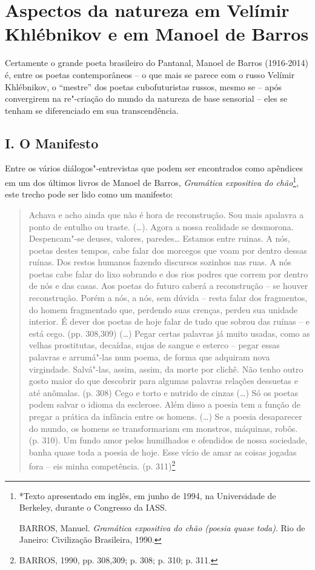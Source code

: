 \chapter{Aspectos da natureza em Velímir Khlébnikov e em Manoel de Barros}

Certamente o grande poeta brasileiro do Pantanal, Manoel de Barros
(1916-2014) é, entre os poetas contemporâneos -- o que mais se parece
com o russo Velímir Khlébnikov, o ``mestre'' dos poetas cubofuturistas
russos, mesmo se -- após convergirem na re"-criação do mundo da natureza
de base sensorial -- eles se tenham se diferenciado em sua
transcendência.

\section{I. O Manifesto}

Entre os vários diálogos"-entrevistas que podem ser encontrados como
apêndices em um dos últimos livros de Manoel de Barros, \emph{Gramática
expositiva do chão}\footnote{*Texto apresentado em inglês, em junho de
  1994, na Universidade de Berkeley, durante o Congresso da IASS.

  BARROS, Manuel. \emph{Gramática expositiva do chão (poesia quase
  toda)}. Rio de Janeiro: Civilização Brasileira, 1990.}, este trecho
pode ser lido como um manifesto:

\begin{quote}
Achava e acho ainda que não é hora de reconstrução. Sou mais apalavra a
ponto de entulho ou traste. (\ldots{}). Agora a nossa realidade se desmorona.
Despencam"-se deuses, valores, paredes\ldots{} Estamos entre ruinas. A nós,
poetas destes tempos, cabe falar dos morcegos que voam por dentro dessas
ruínas. Dos restos humanos fazendo discursos sozinhos nas ruas. A nós
poetas cabe falar do lixo sobrando e dos rios podres que correm por
dentro de nós e das casas. Aos poetas do futuro caberá a reconstrução --
se houver reconstrução. Porém a nós, a nós, sem dúvida -- resta falar
dos fragmentos, do homem fragmentado que, perdendo suas crenças, perdeu
sua unidade interior. É dever dos poetas de hoje falar de tudo que
sobrou das ruínas -- e está cego. (pp. 308,309) (\ldots{}) Pegar certas
palavras já muito usadas, como as velhas prostitutas, decaídas, sujas de
sangue e esterco -- pegar essas palavras e arrumá"-las num poema, de
forma que adquiram nova virgindade. Salvá"-las, assim, assim, da morte
por clichê. Não tenho outro gosto maior do que descobrir para algumas
palavras relações dessuetas e até anômalas. (p. 308) Cego e torto e
nutrido de cinzas (\ldots{}) Só os poetas podem salvar o idioma da esclerose.
Além disso a poesia tem a função de pregar a prática da infância entre
os homens. (\ldots{}) Se a poesia desaparecer do mundo, os homens se
transformariam em monstros, máquinas, robôs. (p. 310). Um fundo amor
pelos humilhados e ofendidos de nossa sociedade, banha quase toda a
poesia de hoje. Esse vício de amar as coisas jogadas fora -- eis minha
competência. (p. 311)\footnote{BARROS, 1990, pp. 308,309; p. 308; p.
  310; p. 311.}
\end{quote}

